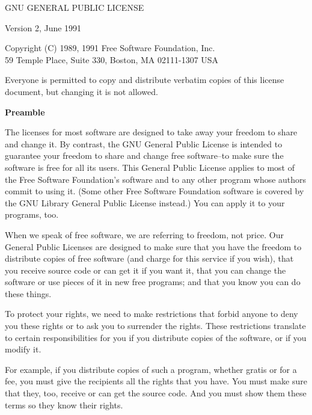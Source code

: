 {\small
\begin{center}
		    {\large GNU GENERAL PUBLIC LICENSE}

		       Version 2, June 1991


 {\sc Copyright (C) 1989, 1991 Free Software Foundation, Inc.\\
 59 Temple Place, Suite 330, Boston, MA  02111-1307  USA}
\end{center}

\vspace{0.75em}

 Everyone is permitted to copy and distribute verbatim copies
 of this license document, but changing it is not allowed.


\vspace{0.75cm}

{\bf Preamble}

\vspace{0.5cm}

  The licenses for most software are designed to take away your
freedom to share and change it.  By contrast, the GNU General Public
License is intended to guarantee your freedom to share and change free
software--to make sure the software is free for all its users.  This
General Public License applies to most of the Free Software
Foundation's software and to any other program whose authors commit to
using it.  (Some other Free Software Foundation software is covered by
the GNU Library General Public License instead.)  You can apply it to
your programs, too.

  When we speak of free software, we are referring to freedom, not
price.  Our General Public Licenses are designed to make sure that you
have the freedom to distribute copies of free software (and charge for
this service if you wish), that you receive source code or can get it
if you want it, that you can change the software or use pieces of it
in new free programs; and that you know you can do these things.

  To protect your rights, we need to make restrictions that forbid
anyone to deny you these rights or to ask you to surrender the rights.
These restrictions translate to certain responsibilities for you if you
distribute copies of the software, or if you modify it.

  For example, if you distribute copies of such a program, whether
gratis or for a fee, you must give the recipients all the rights that
you have.  You must make sure that they, too, receive or can get the
source code.  And you must show them these terms so they know their
rights.

}

